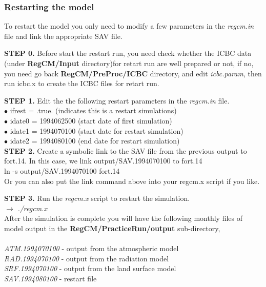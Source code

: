 \subsubsection{Restarting the model}
To restart the model you only need to modify a few parameters in the 
{\it regcm.in} file and link the appropriate SAV file.  

\noindent
{\bf STEP 0.} Before start the restart run, you need check whether the ICBC data (under  {\bf RegCM/Input} directory)for
retart run are well prepared or not, if no, you need go back {\bf RegCM/PreProc/ICBC} directory, and edit {\it icbc.param}, then run icbc.x to create the ICBC files for retart run.

\noindent
{\bf STEP 1.} Edit the the following restart parameters in the {\it regcm.in} file.  \\

\indent 
$\bullet$   ifrest = .true.  (indicates this is a restart simulations) \\
\indent 
$\bullet$   idate0 = 1994062500  (start date of first simulation) \\
\indent 
$\bullet$   idate1 = 1994070100  (start date for restart simulation) \\
\indent 
$\bullet$   idate2 = 1994080100  (end date for restart simulation) \\

\noindent
{\bf STEP 2.} Create a symbolic link to the SAV file from the previous output to fort.14. In this case, we link output/SAV.1994070100 to fort.14 \\
\indent
ln -s output/SAV.1994070100 fort.14  \\ 

\noindent
Or you can also put the link command above into your regcm.x script if you like.

\noindent
{\bf STEP 3.} Run the {\it regcm.x} script to restart the simulation. \\

\indent 
$\rightarrow$   {\it ./regcm.x } \\

\noindent
After the simulation is complete you will have the following monthly files of model output in the 
{\bf RegCM/PracticeRun/output} sub-directory, \\
\\

{\it ATM.1994070100} - output from the atmospheric model \\
\indent
{\it RAD.1994070100} - output from the radiation model  \\
\indent
{\it SRF.1994070100} - output from the land surface model \\
\indent
{\it SAV.1994080100} - restart file \\



